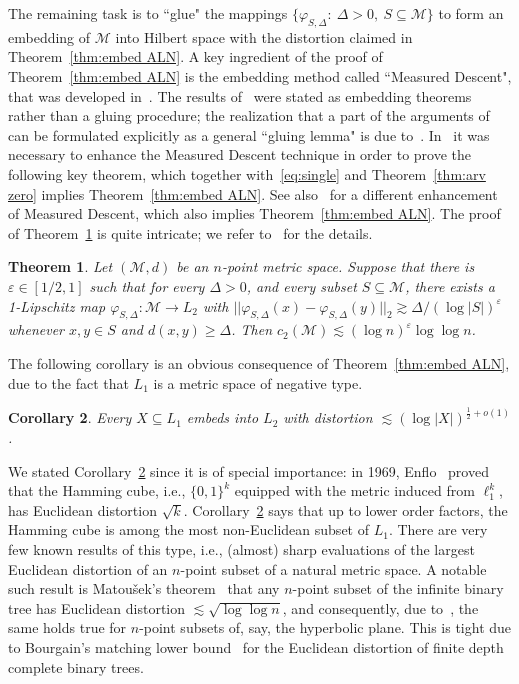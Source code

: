 \documentclass{icm2010}
\newtheorem{theorem}{Theorem}[section]
\newtheorem{cor}[theorem]{Corollary}
\theoremstyle{definition}
\newcommand{\1}{\mathbf{1}}
\newcommand{\M}{\mathscr{M}}
\renewcommand{\ge}{\geqslant}
\newcommand{\e}{\varepsilon}
\newcommand{\f}{\varphi}
\begin{document}
The remaining task is to ``glue" the mappings $\{\f_{S,\Delta}:\
\Delta>0,\ S\subseteq \M\}$ to form an embedding of $\M$ into
Hilbert space with the distortion claimed in
Theorem~\ref{thm:embed ALN}. A key ingredient of the proof of
Theorem~\ref{thm:embed ALN} is the embedding method called
``Measured Descent", that was developed in~\cite{KLMN05}. The
results of~\cite{KLMN05} were stated as embedding theorems rather than a gluing procedure; the
realization that a part of the arguments of~\cite{KLMN05} can be formulated explicitly as a general ``gluing lemma" is due
to~\cite{Lee05}. In~\cite{ALN08} it was necessary to enhance
the Measured Descent technique in order to prove the following key
theorem, which together with~\eqref{eq:single} and
Theorem~\ref{thm:arv zero} implies Theorem~\ref{thm:embed ALN}. See also~\cite{ALN-frechet} for a different enhancement of Measured Descent, which also implies Theorem~\ref{thm:embed ALN}. The
proof of Theorem~\ref{thm:new gluing} is quite intricate; we refer
to~\cite{ALN08} for the details.

\begin{theorem}\label{thm:new gluing}
Let $(\M,d)$ be an $n$-point metric space. Suppose that there is
 $\e\in [1/2,1]$ such
that for every $\Delta > 0$, and every subset $S \subseteq \M$,
there exists a 1-Lipschitz map $\f_{S,\Delta} : \M \to L_2$ with $
||\f_{S,\Delta}(x) - \f_{S,\Delta}(y)||_2 \gtrsim \Delta/(\log
|S|)^\varepsilon$ whenever $x,y \in S$ and $d(x,y) \ge \Delta$. Then
$c_2(\M) \lesssim(\log n)^{\varepsilon} \log \log n$.
\end{theorem}





The following corollary is an obvious consequence of
Theorem~\ref{thm:embed ALN}, due to the fact that $L_1$ is a metric
space of negative type.
\begin{cor}\label{cor:L1}
Every $X\subseteq L_1$ embeds into $L_2$ with distortion $\lesssim
(\log |X|)^{\frac12+o(1)}$.
\end{cor}
We stated Corollary~\ref{cor:L1} since it is of special importance:
in 1969, Enflo~\cite{Enflo69} proved that the Hamming cube, i.e.,
$\{0,1\}^k$ equipped with the metric induced  from $\ell_1^k$, has
Euclidean distortion $\sqrt{k}$. Corollary~\ref{cor:L1} says that up
to lower order factors, the Hamming cube is among the most non-Euclidean
subset of $L_1$. There are very few known results of this type,
i.e., (almost) sharp evaluations of the largest Euclidean distortion
of an $n$-point subset of a natural metric space. A notable such
result is Matou\v{s}ek's theorem~\cite{Mat99} that any $n$-point
subset of the infinite binary tree has Euclidean distortion
$\lesssim \sqrt{\log \log n}$, and consequently, due to~\cite{BS05},
the same holds true for $n$-point subsets of, say, the hyperbolic
plane. This is tight due to Bourgain's matching lower
bound~\cite{Bou-tree} for the Euclidean distortion of finite depth
complete binary trees.
\end{document}
